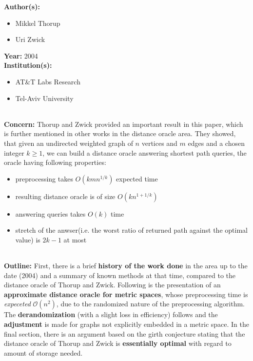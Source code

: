 \documentclass[a4paper]{article}
\newenvironment{itemizesp}
{
    \begin{itemize}
}
{
    \end{itemize}
}
\newcommand{\textbff}[1]{{\large \textbf{#1}}}
\begin{document}
        \textbff{Author(s): }
        \begin{itemizesp}
            \item Mikkel Thorup
            \item Uri Zwick
        \end{itemizesp}
        \textbff{Year: } 2004 \\
        \textbff{Institution(s): }
        \begin{itemizesp}
            \item AT\&T Labs Research
            \item Tel-Aviv University
        \end{itemizesp}
        {\hfill}\\
        \textbff{Concern:} Thorup and Zwick provided an important result in this paper, which is further mentioned in other works in the distance oracle area. \def\resthzwck{They showed, that given an undirected weighted graph of $n$ vertices and $m$ edges and a chosen integer $k \geq 1$, we can build a distance oracle answering shortest path queries, the oracle having following properties:
        \begin{itemizesp}
            \item preprocessing takes $O(kmn^{1/k})$ expected time
            \item resulting distance oracle is of size $O(kn^{1 + 1/k})$
            \item answering queries takes $O(k)$ time
            \item stretch of the anwser(i.e. the worst ratio of returned path against the optimal value) is $2k - 1$ at most
        \end{itemizesp}}\resthzwck
        {\hfill}\\
        \textbff{Outline:} First, there is a brief \textbf{history of the work done} in the area up to the date (2004) and a summary of known methods at that time, compared to the distance oracle of Thorup and Zwick. Following is the presentation of an \textbf{approximate distance oracle for metric spaces}, whose preprocessing time is \emph{expeceted} $\mathcal{O}(n^2)$, due to the randomized nature of the preprocessing algorithm. The \textbf{derandomization} (with a slight loss in efficiency) follows and the \textbf{adjustment} is made for graphs not explicitly embedded in a metric space. In the final section, there is an argument based on the girth conjecture stating that the distance oracle of Thorup and Zwick is \textbf{essentially optimal} with regard to amount of storage needed. \\
        {\hfill}
\end{document}
